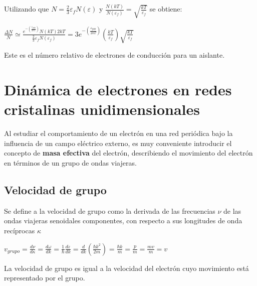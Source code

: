 \documentclass[oneside]{book}
\numberwithin{equation}{section}
\numberwithin{figure}{section}
\numberwithin{table}{section}
\begin{document}
				Utilizando que $\displaystyle N=\frac{2}{3}\varepsilon_f N(\varepsilon)$ y $\displaystyle \frac{N(kT)}{N(\varepsilon_f)}=\sqrt{\frac{kT}{\varepsilon_f}}$ se obtiene:
				
				\begin{center}
					$\displaystyle \frac{\Delta N}{N} \simeq \frac{e^{-\left(\frac{\varepsilon_{gap}}{2kT}\right)} N(kT)2kT}{\frac{2}{3}\varepsilon_f N(\varepsilon_f)}=3e^{-\left(\frac{\varepsilon_{gap}}{2kT}\right)}\left(\frac{kT}{\varepsilon_f}\right)\sqrt{\frac{kT}{\varepsilon_f}}$
				\end{center}
				\begin{center}
				\end{center}
			
				Este es el número relativo de electrones de conducción para un aislante.\\
			
		\section{Dinámica de electrones en redes cristalinas unidimensionales}

			Al estudiar el comportamiento de un electrón en una red periódica bajo la influencia de un campo eléctrico externo, es muy conveniente introducir el concepto de \textbf{masa efectiva} del electrón, describiendo el movimiento del electrón en términos de un grupo de ondas viajeras.		
		
			\subsection{Velocidad de grupo}
			
				Se define a la velocidad de grupo como la derivada de las frecuencias $\nu$ de las ondas viajeras senoidales componentes, con respecto a sus longitudes de onda recíprocas $\kappa$
				
				\begin{center}
					$\displaystyle v_{grupo}=\frac{d \nu}{d \kappa}=\frac{d\omega}{dk}=\frac{1}{\hbar}\frac{d\varepsilon}{dk}=\frac{d}{dk}\left(\frac{\hbar k^2}{2m}\right)=\frac{\hbar k}{m}=\frac{p}{m}=\frac{mv}{m}=v$	
				\end{center}		
			
			La velocidad de grupo es igual a la velocidad del electrón cuyo movimiento está representado por el grupo.
			
\end{document}
